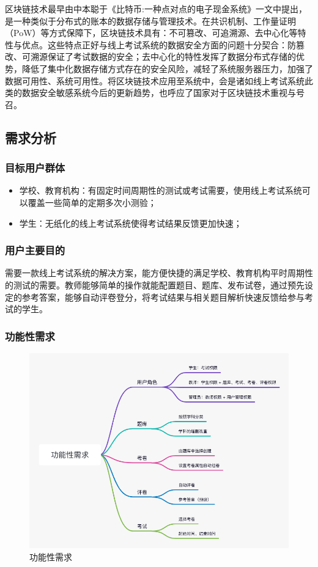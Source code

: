 区块链技术最早由中本聪于《比特币:一种点对点的电子现金系统》一文中提出，是一种类似于分布式的账本的数据存储与管理技术。在共识机制、工作量证明（PoW）等方式保障下，区块链技术具有：不可篡改、可追溯源、去中心化等特性与优点。这些特点正好与线上考试系统的数据安全方面的问题十分契合：防篡改、可溯源保证了考试数据的安全；去中心化的特性发挥了数据分布式存储的优势，降低了集中化数据存储方式存在的安全风险，减轻了系统服务器压力，加强了数据可用性、系统可用性。将区块链技术应用至系统中，会是诸如线上考试系统此类的数据安全敏感系统今后的更新趋势，也呼应了国家对于区块链技术重视与号召。


\subsection{需求分析}
\subsubsection{目标用户群体}
\begin{itemize}
    \item 学校、教育机构：有固定时间周期性的测试或考试需要，使用线上考试系统可以覆盖一些简单的定期多次小测验；
    \item 学生：无纸化的线上考试系统使得考试结果反馈更加快速；
\end{itemize}

\subsubsection{用户主要目的}
需要一款线上考试系统的解决方案，能方便快捷的满足学校、教育机构平时周期性的测试的需要。教师能够简单的操作就能配置题目、题库、发布试卷，通过预先设定的参考答案，能够自动评卷登分，将考试结果与相关题目解析快速反馈给参与考试的学生。

\subsubsection{功能性需求}
\begin{figure}[htb!]
    \centering
    \includegraphics[width=0.8\linewidth]{_images/功能性需求.png}
    \caption{功能性需求}
    \label{功能性需求}
\end{figure}
